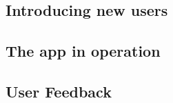 \subsection{Introducing new users}

\subsection{The app in operation}

\subsection{User Feedback}

\newpage